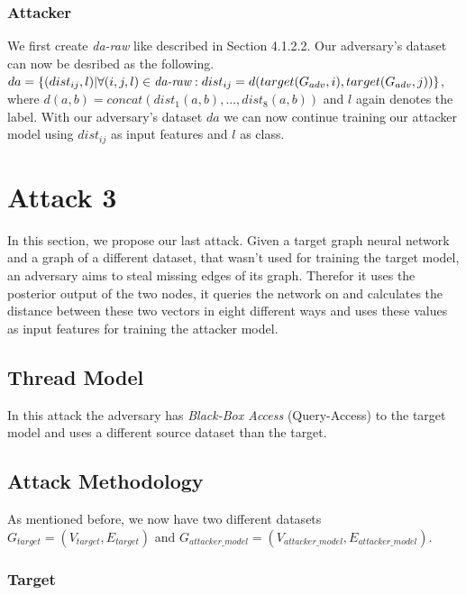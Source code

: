       \subsubsection{Attacker}

        We first create \emph{da-raw} like described in Section 4.1.2.2.
        Our adversary's dataset can now be desribed as the following.
        $da = \{(dist_{ij}, l) | \forall (i,j,l)\in\emph{da-raw}: dist_{ij} = d(target(G_{adv}, i), target(G_{adv}, j))\}$, where $d(a,b) = concat(dist_1(a,b), ..., dist_8(a,b))$ and $l$ again denotes the label.
        With our adversary's dataset $da$ we can now continue training our attacker model using $dist_{ij}$ as input features and $l$ as class.

  \section{Attack 3}

    In this section, we propose our last attack. Given a target graph neural network and a graph of a different dataset, that wasn't used for training the target model, an adversary aims to steal missing edges of its graph.
    Therefor it uses the posterior output of the two nodes, it queries the network on and calculates the distance between these two vectors in eight different ways and uses these values as input features for training the attacker model.

    \subsection{Thread Model}

      In this attack the adversary has \emph{Black-Box Access} (Query-Access) to the target model and uses a different source dataset than the target.

    \subsection{Attack Methodology}

      As mentioned before, we now have two different datasets $G_{target} = (V_{target}, E_{target})$ and $G_{attacker\_model} = (V_{attacker\_model}, E_{attacker\_model})$.

      \subsubsection{Target}

